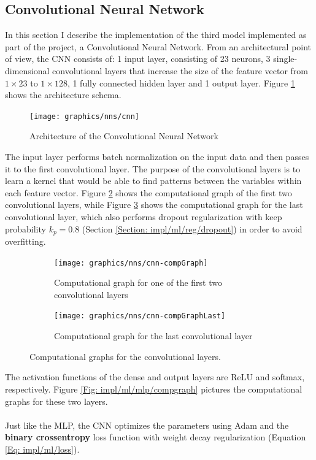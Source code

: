 	\subsection{Convolutional Neural Network} \label{Section: impl/ml/cnn}
	In this section I describe the implementation of the third model implemented as part of the project, a Convolutional Neural Network. From an architectural point of view, the CNN consists of: 1 input layer, consisting of 23 neurons, 3 single-dimensional convolutional layers that increase the size of the feature vector from $1\times23$ to $1\times128$, 1 fully connected hidden layer and 1 output layer. Figure \ref{Fig: impl/ml/cnn/architecture} shows the architecture schema. 
	\begin{figure}[H]
		\centering
		\texttt{[image: graphics/nns/cnn]}
		\caption{Architecture of the Convolutional Neural Network}
		\label{Fig: impl/ml/cnn/architecture}
	\end{figure}
	The input layer performs batch normalization on the input data and then passes it to the first convolutional layer. The purpose of the convolutional layers is to learn a kernel that would be able to find patterns between the variables within each feature vector. Figure \ref{Fig: impl/ml/cnn/compGraph} shows the computational graph of the first two convolutional layers, while Figure \ref{Fig: impl/ml/cnn/compGraphLast} shows the computational graph for the last convolutional layer, which also performs dropout regularization with keep probability $k_p = 0.8$ (Section \ref{Section: impl/ml/reg/dropout}) in order to avoid overfitting. 
	\begin{figure}[H]
		\centering
		\begin{subfigure}[b]{.4\textwidth}
			\centering
			\texttt{[image: graphics/nns/cnn-compGraph]}
			\caption{Computational graph for one of the first two convolutional layers}
			\label{Fig: impl/ml/cnn/compGraph}
		\end{subfigure}
		\begin{subfigure}[b]{.4\textwidth}
			\centering
			\texttt{[image: graphics/nns/cnn-compGraphLast]}
			\caption{Computational graph for the last convolutional layer}
			\label{Fig: impl/ml/cnn/compGraphLast}
		\end{subfigure}
		\caption{Computational graphs for the convolutional layers.}
		\label{Fig: impl/ml/cnn/compGraphs}
	\end{figure}
	The activation functions of the dense and output layers are ReLU and softmax, respectively. Figure \ref{Fig: impl/ml/mlp/compgraph} pictures the computational graphs for these two layers. 
	\\ \\
	Just like the MLP, the CNN optimizes the parameters using Adam and the \textbf{binary crossentropy} loss function with weight decay regularization (Equation \ref{Eq: impl/ml/loss}).
